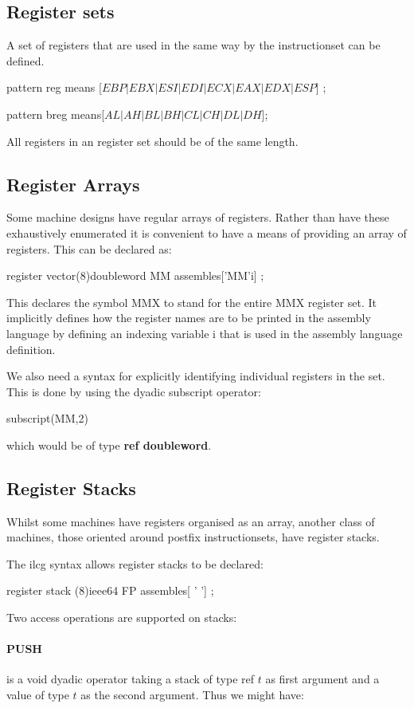 {{\subsection{Register sets}
A set of registers that are used in the same way by the instructionset
can be defined.
{\bf

pattern reg means [$ EBP| EBX|ESI|EDI|ECX |EAX|EDX|ESP$]  ;

pattern breg means[$ AL|AH|BL|BH|CL|CH|DL|DH$];
}

All registers in an register set should be of the same length.


\subsection{Register Arrays}
Some machine designs have regular arrays of registers.
Rather than have these exhaustively enumerated it is convenient to
have a means of providing an array of registers.
This can be declared as:


{\bf

register  vector(8)doubleword MM assembles['MM'i] ;

}
 
 
This declares the symbol MMX to stand for the entire MMX register
set. It implicitly defines how the register names are to be
printed in the assembly language by defining an indexing variable
i that is used in the assembly language definition.

We also need a syntax for explicitly identifying individual
registers in the set. This is done by using
the dyadic subscript operator:
{\bf

subscript(MM,2)

}
which would be of type {\bf ref doubleword}.
\subsection{Register Stacks}
Whilst some machines have registers organised as an array,
another class of machines, those oriented around postfix instructionsets,
have register stacks.

The ilcg syntax allows register stacks to be declared:



{\bf

register stack (8)ieee64 FP assembles[ ' '] ;


}

Two access operations are supported on stacks:
\paragraph{PUSH} is a void dyadic operator taking a stack of type ref $t$ as first argument
and a value of  type $t$ as the second argument. Thus we might have:
{ \bf

}}}
